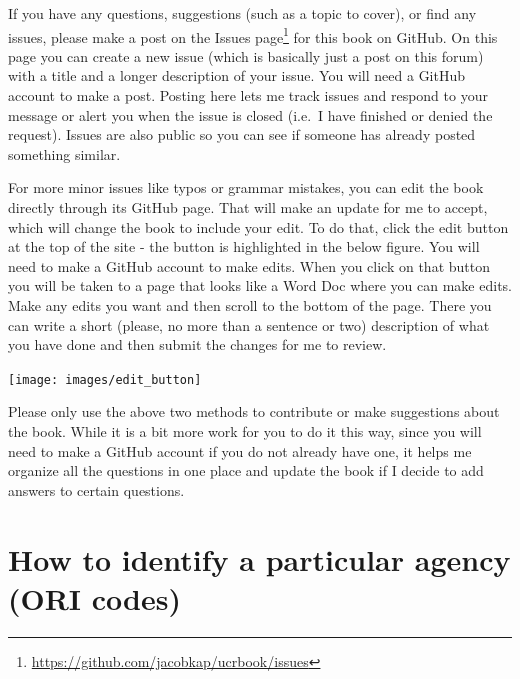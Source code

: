 \documentclass[
]{krantz}
\let\origfigure\figure
\let\endorigfigure\endfigure
\renewenvironment{figure}[1][2] {
    \expandafter\origfigure\expandafter[H]
} {
    \endorigfigure
}
\renewcommand{\href}[2]{#2\footnote{\url{#1}}}
\begin{document}
If you have any questions, suggestions (such as a topic to
cover), or find any issues, please make a post on the
\href{https://github.com/jacobkap/ucrbook/issues}{Issues
page} for this book on GitHub. On this page you can create a
new issue (which is basically just a post on this forum)
with a title and a longer description of your issue. You
will need a GitHub account to make a post. Posting here lets
me track issues and respond to your message or alert you
when the issue is closed (i.e.~I have finished or denied the
request). Issues are also public so you can see if someone
has already posted something similar.

For more minor issues like typos or grammar mistakes, you
can edit the book directly through its GitHub page. That
will make an update for me to accept, which will change the
book to include your edit. To do that, click the edit button
at the top of the site - the button is highlighted in the
below figure. You will need to make a GitHub account to make
edits. When you click on that button you will be taken to a
page that looks like a Word Doc where you can make edits.
Make any edits you want and then scroll to the bottom of the
page. There you can write a short (please, no more than a
sentence or two) description of what you have done and then
submit the changes for me to review.

\begin{figure}

{\centering \texttt{[image: images/edit\_button]} 

}

\caption{The edit button for how to make edits of this book.}\label{fig:unnamed-chunk-3}
\end{figure}

Please only use the above two methods to contribute or make
suggestions about the book. While it is a bit more work for
you to do it this way, since you will need to make a GitHub
account if you do not already have one, it helps me organize
all the questions in one place and update the book if I
decide to add answers to certain questions.

\section{How to identify a particular agency (ORI
codes)}\label{ori}
\end{document}
